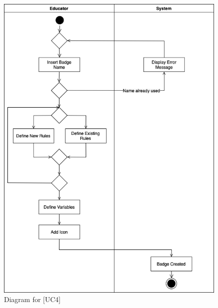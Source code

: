 \documentclass[12pt,oneside,a4paper]{article}
\begin{document}
\begin{figure}[htbp]
    \centering
    \includegraphics[width=1\linewidth]{Images/Diagrams/CreateBadges.png}
    \caption{Diagram for [UC4]}
    \label{fig:enter-label}
\end{figure}

\pagebreak
\end{document}
